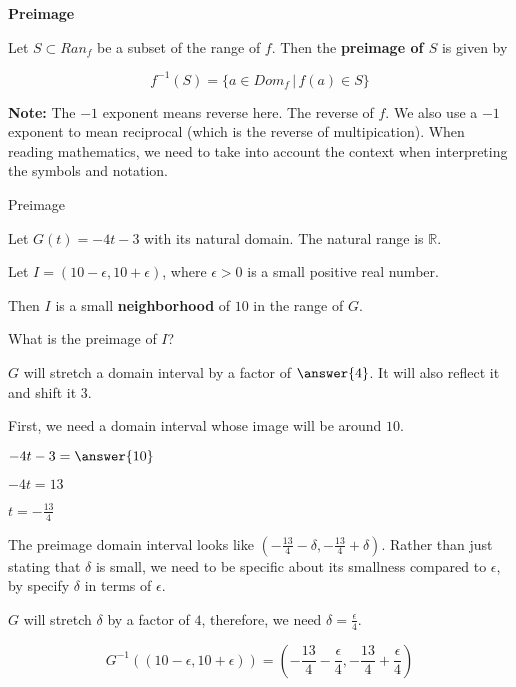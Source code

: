 \documentclass{ximera}
\begin{document}
\begin{definition} \textbf{\textcolor{green!50!black}{Preimage}}


Let $S \subset Ran_f$ be a subset of the range of $f$.  Then the \textbf{preimage of $S$} is given by

\[       f^{-1}(S) = \{   a \in Dom_f  \, | \, f(a) \in S  \}             \]



\textbf{Note:}  The $-1$ exponent means reverse here. The reverse of $f$.  We also use a $-1$ exponent to mean reciprocal (which is the reverse of multipication).  When reading mathematics, we need to take into account the context when interpreting the symbols and notation.


\end{definition}












\begin{example} Preimage

Let $G(t) = -4t - 3$ with its natural domain.  The natural range is $\mathbb{R}$.

Let  $I = (10-\epsilon, 10+\epsilon)$, where $\epsilon > 0$ is a small positive real number.  

Then $I$ is a small \textbf{neighborhood} of $10$ in the range of $G$.


What is the preimage of $I$?

\begin{explanation}





$G$ will stretch a domain interval by a factor of $\answer{4}$.  It will also reflect it and shift it $3$.  


First, we need a domain interval whose image will be around $10$.

$-4t-3 = \answer{10}$

$-4t = 13$

$t = -\frac{13}{4}$



The preimage domain interval looks like $\left( -\frac{13}{4} - \delta, -\frac{13}{4} + \delta \right)$.  Rather than just stating that $\delta$ is small, we need to be specific about its smallness compared to $\epsilon$, by specify $\delta$ in terms of $\epsilon$.

$G$ will stretch $\delta$ by a factor of $4$, therefore,  we need $\delta = \frac{\epsilon}{4}$. 




\[   G^{-1}((10-\epsilon, 10+\epsilon)) = \left( -\frac{13}{4} - \frac{\epsilon}{4}, -\frac{13}{4} + \frac{\epsilon}{4} \right)   \]


\end{explanation}
\end{example}
\end{document}
